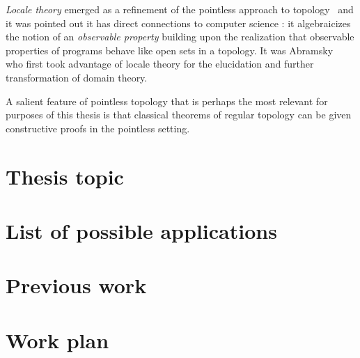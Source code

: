\documentclass[11pt]{article}
\begin{document}
\emph{Locale theory} emerged as a refinement of the pointless approach to topology~\cite{
  johnstone:1982} and it was pointed out it has direct connections to computer science :
it algebraicizes the notion of an \emph{observable property} building upon the realization
that observable properties of programs behave like open sets in a topology. It was
Abramsky~\cite{abramsky:1991} who first took advantage of locale theory for the
elucidation and further transformation of domain theory.

A salient feature of pointless topology that is perhaps the most relevant for purposes of
this thesis is that classical theorems of regular topology can be given constructive
proofs in the pointless setting.

\section{Thesis topic}

\section{List of possible applications}

\section{Previous work}

\section{Work plan}



\end{document}
